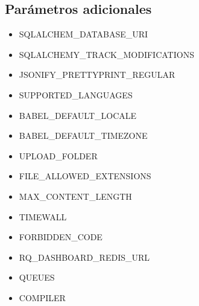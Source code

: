 \documentclass[11pt,spanish,listoffigures,listoftables]{tfgetsinf}
\begin{document}
\subsection*{Parámetros adicionales}

\begin{itemize}
	\item SQLALCHEM\_DATABASE\_URI
	\item SQLALCHEMY\_TRACK\_MODIFICATIONS
	\item JSONIFY\_PRETTYPRINT\_REGULAR
	\item SUPPORTED\_LANGUAGES
	\item BABEL\_DEFAULT\_LOCALE
	\item BABEL\_DEFAULT\_TIMEZONE
	\item UPLOAD\_FOLDER
	\item FILE\_ALLOWED\_EXTENSIONS
	\item MAX\_CONTENT\_LENGTH
	\item TIMEWALL
	\item FORBIDDEN\_CODE
	\item RQ\_DASHBOARD\_REDIS\_URL
	\item QUEUES
	\item COMPILER
\end{itemize}

\glsaddall
\printglossary[title=Acrónimos,type=\acronymtype]

\glsaddall
\printglossary[title=Términos,toctitle=Terms and abbreviations]
\end{document}
